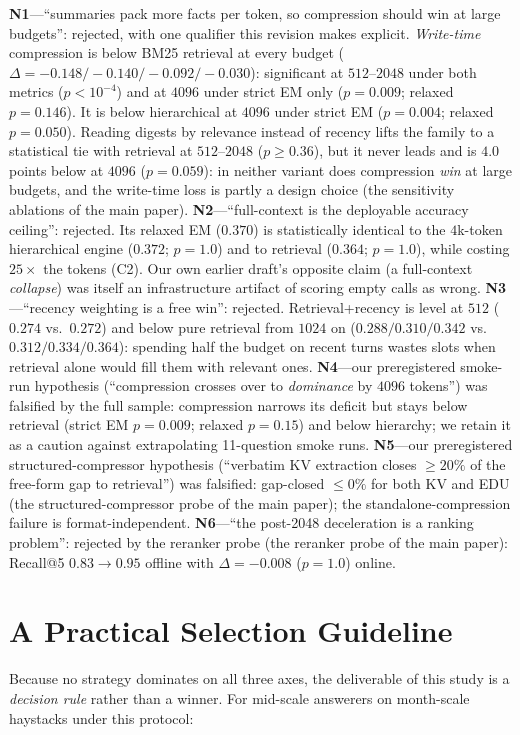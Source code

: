 \documentclass{article} %
\begin{document}
\textbf{N1}---``summaries pack more facts per token, so compression should win at large
budgets'': rejected, with one qualifier this revision makes explicit. \emph{Write-time}
compression is below BM25 retrieval at every budget
($\Delta{=}-0.148/-0.140/-0.092/-0.030$): significant at $512$--$2048$ under both metrics
($p<10^{-4}$) and at $4096$ under strict EM only ($p{=}0.009$; relaxed $p{=}0.146$). It is
below hierarchical at $4096$ under strict EM ($p{=}0.004$; relaxed $p{=}0.050$). Reading
digests by relevance instead of recency lifts the family to a statistical tie with retrieval
at $512$--$2048$ ($p\geq0.36$), but it never leads and is $4.0$ points below at $4096$
($p{=}0.059$): in neither variant does compression \emph{win} at large budgets, and the
write-time loss is partly a design choice (the sensitivity ablations of the main paper).
\textbf{N2}---``full-context is the deployable accuracy ceiling'': rejected. Its relaxed EM
($0.370$) is statistically identical to the $4$k-token hierarchical engine ($0.372$;
$p{=}1.0$) and to retrieval ($0.364$; $p{=}1.0$), while costing $25\times$ the tokens (C2). Our
own earlier draft's opposite claim (a full-context \emph{collapse}) was itself an
infrastructure artifact of scoring empty calls as wrong.
\textbf{N3}---``recency weighting is a free win'': rejected. Retrieval+recency is level at
$512$ ($0.274$ vs.\ $0.272$) and below pure retrieval from $1024$ on ($0.288/0.310/0.342$
vs.\ $0.312/0.334/0.364$): spending half the budget on recent turns wastes slots when
retrieval alone would fill them with relevant ones.
\textbf{N4}---our preregistered smoke-run hypothesis (``compression crosses over to
\emph{dominance} by $4096$ tokens'') was falsified by the full sample: compression narrows its
deficit but stays below retrieval (strict EM $p{=}0.009$; relaxed $p{=}0.15$) and below
hierarchy; we retain it as a caution against extrapolating 11-question smoke runs.
\textbf{N5}---our preregistered structured-compressor hypothesis (``verbatim KV extraction
closes $\geq 20\%$ of the free-form gap to retrieval'') was falsified: gap-closed $\leq 0\%$
for both KV and EDU (the structured-compressor probe of the main paper); the standalone-compression failure is
format-independent.
\textbf{N6}---``the post-2048 deceleration is a ranking problem'': rejected by the reranker
probe (the reranker probe of the main paper): Recall@5 $0.83 \rightarrow 0.95$ offline with $\Delta{=}-0.008$
($p{=}1.0$) online.

\section{A Practical Selection Guideline}
\label{sec:guideline}
Because no strategy dominates on all three axes, the deliverable of this study is a
\emph{decision rule} rather than a winner. For mid-scale answerers on month-scale haystacks
under this protocol:
\end{document}
